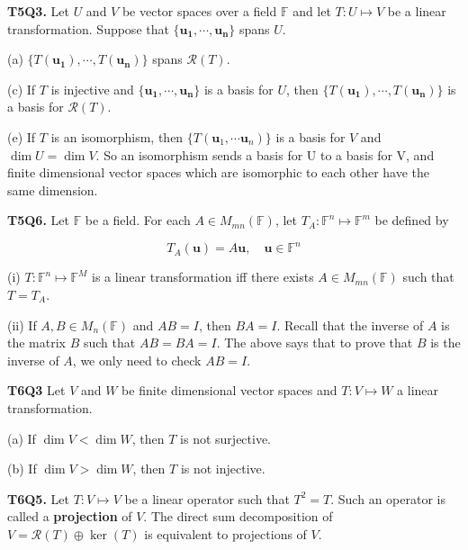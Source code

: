 \documentclass[10pt,landscape]{article}
\begin{document}
\begin{multicols}{4}
\textbf{T5Q3.} Let $U$ and $V$ be vector spaces over a field $\mathbb{F}$ and let $T : U \mapsto V$ be a linear transformation. Suppose that $\{ \mathbf{u_1}, \cdots, \mathbf{u_n} \}$ spans $U$.

(a) $\{ T(\mathbf{u_1}), \cdots, T(\mathbf{u_n}) \}$ spans $\mathcal{R}(T)$.

(c) If $T$ is injective and $\{ \mathbf{u_1}, \cdots, \mathbf{u_n} \}$ is a basis for $U$, then $\{ T(\mathbf{u_1}), \cdots, T(\mathbf{u_n}) \}$ is a basis for $\mathcal{R}(T)$.

(e) If $T$ is an isomorphism, then $\{ T(\mathbf{u}_1, \cdots \mathbf{u}_n) \}$ is a basis for $V$ and $\dim U = \dim V$. So an isomorphism sends a basis for U to a basis for V, and finite dimensional vector spaces which are isomorphic to each other have the same dimension.

\textbf{T5Q6.} Let $\mathbb{F}$ be a field. For each $A \in M_{mn}(\mathbb{F})$, let $T_A : \mathbb{F}^n \mapsto \mathbb{F}^m$ be defined by 

$$
T_A(\mathbf{u}) = A\mathbf{u}, \quad \mathbf{u} \in \mathbb{F}^n
$$

(i) $T: \mathbb{F}^n \mapsto \mathbb{F}^M$ is a linear transformation iff there exists $A \in M_{mn}(\mathbb{F})$ such that $T = T_A$.

(ii) If $A, B \in M_n(\mathbb{F})$ and $AB = I$, then $BA = I$. Recall that the inverse of $A$ is the matrix $B$ such that $AB = BA = I$. The above says that to prove that $B$ is the inverse of $A$, we only need to check $AB = I$.

\textbf{T6Q3} Let $V$ and $W$ be finite dimensional vector spaces and $T: V \mapsto W$ a linear transformation. 

(a) If $\dim V < \dim W$, then $T$ is not surjective.

(b) If $\dim V > \dim W$, then $T$ is not injective.

\textbf{T6Q5.} Let $T: V \mapsto V$ be a linear operator such that $T^2 = T$. Such an operator is called a \textbf{projection} of $V$. The direct sum decomposition of $V = \mathcal{R}(T) \oplus \ker (T)$ is equivalent to projections of $V$.




\end{multicols}
\end{document}
